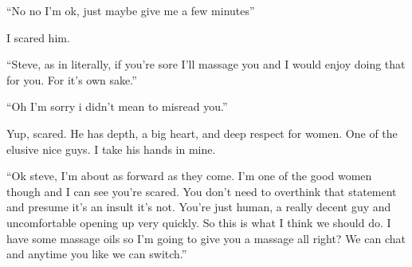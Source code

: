 ``No no I'm ok, just maybe give me a few minutes''

I scared him.

``Steve, as in literally, if you're sore I'll massage you and I would enjoy doing that for you. For it's own sake.''

``Oh I'm sorry i didn't mean to misread you.''

Yup, scared. He has depth, a big heart, and deep respect for women. One of the elusive nice guys. I take his hands in mine.

``Ok steve, I'm about as forward as they come. I'm one of the good women though and I can see you're scared. You don't need to overthink that statement and presume it's an insult it's not. You're just human, a really decent guy and uncomfortable opening up very quickly. So this is what I think we should do. I have some massage oils so I'm going to give you a massage all right? We can chat and anytime you like we can switch.''

